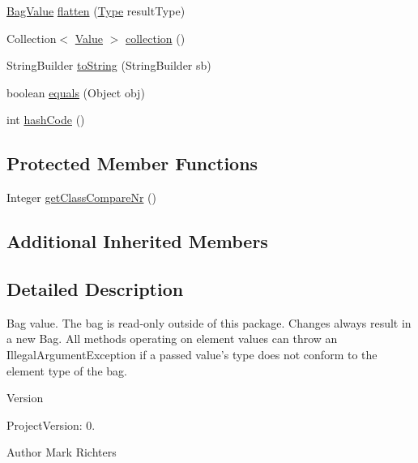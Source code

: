 \begin{DoxyCompactItemize}
\item 
\hyperlink{classorg_1_1tzi_1_1use_1_1uml_1_1ocl_1_1value_1_1_bag_value}{Bag\-Value} \hyperlink{classorg_1_1tzi_1_1use_1_1uml_1_1ocl_1_1value_1_1_bag_value_a365a7cca38000513d20ae932d21a2ac4}{flatten} (\hyperlink{interfaceorg_1_1tzi_1_1use_1_1uml_1_1ocl_1_1type_1_1_type}{Type} result\-Type)
\item 
Collection$<$ \hyperlink{classorg_1_1tzi_1_1use_1_1uml_1_1ocl_1_1value_1_1_value}{Value} $>$ \hyperlink{classorg_1_1tzi_1_1use_1_1uml_1_1ocl_1_1value_1_1_bag_value_a6605ff7210bc822a7f0c6f951ec2328f}{collection} ()
\item 
String\-Builder \hyperlink{classorg_1_1tzi_1_1use_1_1uml_1_1ocl_1_1value_1_1_bag_value_af36c18514d22a595c00df0a6c7fa3cbe}{to\-String} (String\-Builder sb)
\item 
boolean \hyperlink{classorg_1_1tzi_1_1use_1_1uml_1_1ocl_1_1value_1_1_bag_value_a69da9486a1d9c11986e0f11745a21241}{equals} (Object obj)
\item 
int \hyperlink{classorg_1_1tzi_1_1use_1_1uml_1_1ocl_1_1value_1_1_bag_value_a5e1beeaad1e22b25124aa59b3aa5d406}{hash\-Code} ()
\end{DoxyCompactItemize}
\subsection*{Protected Member Functions}
\begin{DoxyCompactItemize}
\item 
Integer \hyperlink{classorg_1_1tzi_1_1use_1_1uml_1_1ocl_1_1value_1_1_bag_value_a925c892f02c3a1365a7eba399b21921b}{get\-Class\-Compare\-Nr} ()
\end{DoxyCompactItemize}
\subsection*{Additional Inherited Members}


\subsection{Detailed Description}
Bag value. The bag is read-\/only outside of this package. Changes always result in a new Bag. All methods operating on element values can throw an Illegal\-Argument\-Exception if a passed value's type does not conform to the element type of the bag.

\begin{DoxyVersion}{Version}

\end{DoxyVersion}
\begin{DoxyParagraph}{Project\-Version\-:}
0. 
\end{DoxyParagraph}
\begin{DoxyAuthor}{Author}
Mark Richters 
\end{DoxyAuthor}


